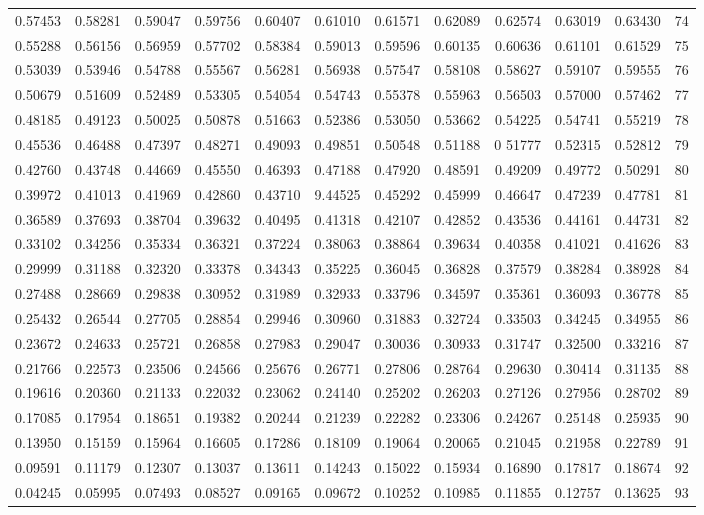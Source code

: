 \begin{center}
\begin{tabular}{|rrrrrrrrrrr|r|}
0.57453&0.58281&0.59047&0.59756&0.60407&0.61010&0.61571&0.62089&0.62574&0.63019&0.63430&74\\[5pt]
0.55288&0.56156&0.56959&0.57702&0.58384&0.59013&0.59596&0.60135&0.60636&0.61101&0.61529&75\\
0.53039&0.53946&0.54788&0.55567&0.56281&0.56938&0.57547&0.58108&0.58627&0.59107&0.59555&76\\
0.50679&0.51609&0.52489&0.53305&0.54054&0.54743&0.55378&0.55963&0.56503&0.57000&0.57462&77\\
0.48185&0.49123&0.50025&0.50878&0.51663&0.52386&0.53050&0.53662&0.54225&0.54741&0.55219&78\\
0.45536&0.46488&0.47397&0.48271&0.49093&0.49851&0.50548&0.51188&0 51777&0.52315&0.52812&79\\[5pt]
0.42760&0.43748&0.44669&0.45550&0.46393&0.47188&0.47920&0.48591&0.49209&0.49772&0.50291&80\\
0.39972&0.41013&0.41969&0.42860&0.43710&9.44525&0.45292&0.45999&0.46647&0.47239&0.47781&81\\
0.36589&0.37693&0.38704&0.39632&0.40495&0.41318&0.42107&0.42852&0.43536&0.44161&0.44731&82\\
0.33102&0.34256&0.35334&0.36321&0.37224&0.38063&0.38864&0.39634&0.40358&0.41021&0.41626&83\\
0.29999&0.31188&0.32320&0.33378&0.34343&0.35225&0.36045&0.36828&0.37579&0.38284&0.38928&84\\[5pt]
0.27488&0.28669&0.29838&0.30952&0.31989&0.32933&0.33796&0.34597&0.35361&0.36093&0.36778&85\\
0.25432&0.26544&0.27705&0.28854&0.29946&0.30960&0.31883&0.32724&0.33503&0.34245&0.34955&86\\
0.23672&0.24633&0.25721&0.26858&0.27983&0.29047&0.30036&0.30933&0.31747&0.32500&0.33216&87\\
0.21766&0.22573&0.23506&0.24566&0.25676&0.26771&0.27806&0.28764&0.29630&0.30414&0.31135&88\\
0.19616&0.20360&0.21133&0.22032&0.23062&0.24140&0.25202&0.26203&0.27126&0.27956&0.28702&89\\[5pt]
0.17085&0.17954&0.18651&0.19382&0.20244&0.21239&0.22282&0.23306&0.24267&0.25148&0.25935&90\\
0.13950&0.15159&0.15964&0.16605&0.17286&0.18109&0.19064&0.20065&0.21045&0.21958&0.22789&91\\
0.09591&0.11179&0.12307&0.13037&0.13611&0.14243&0.15022&0.15934&0.16890&0.17817&0.18674&92\\
0.04245&0.05995&0.07493&0.08527&0.09165&0.09672&0.10252&0.10985&0.11855&0.12757&0.13625&93\\

\end{tabular}
\end{center}
